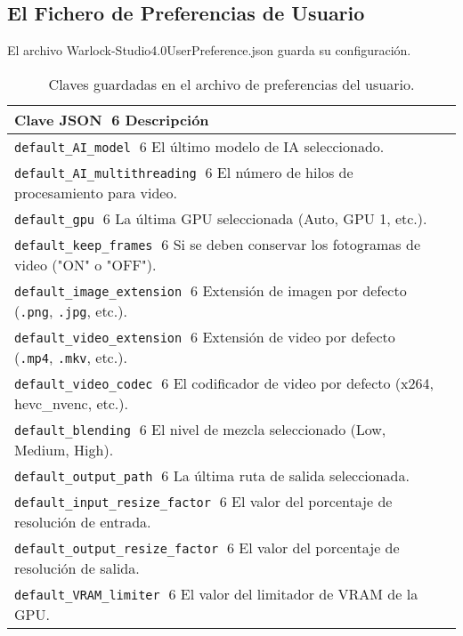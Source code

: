 \documentclass[11pt, a4paper]{article}
\begin{document}
\subsection{El Fichero de Preferencias de Usuario}
El archivo Warlock-Studio4.0UserPreference.json guarda su configuración.
\begin{table}[H]
    \centering
    \small %
    \begin{tabularx}{\textwidth}{l X}
        \toprule
        \textbf{Clave JSON} 6 \textbf{Descripción} \\
        \midrule
        \texttt{default\_AI\_model} 6 El último modelo de IA seleccionado. \\
        \texttt{default\_AI\_multithreading} 6 El número de hilos de procesamiento para video. \\
        \texttt{default\_gpu} 6 La última GPU seleccionada (Auto, GPU 1, etc.). \\
        \texttt{default\_keep\_frames} 6 Si se deben conservar los fotogramas de video ("ON" o "OFF"). \\
        \texttt{default\_image\_extension} 6 Extensión de imagen por defecto (\texttt{.png}, \texttt{.jpg}, etc.). \\
        \texttt{default\_video\_extension} 6 Extensión de video por defecto (\texttt{.mp4}, \texttt{.mkv}, etc.). \\
        \texttt{default\_video\_codec} 6 El codificador de video por defecto (x264, hevc\_nvenc, etc.). \\
        \texttt{default\_blending} 6 El nivel de mezcla seleccionado (Low, Medium, High). \\
        \texttt{default\_output\_path} 6 La última ruta de salida seleccionada. \\
        \texttt{default\_input\_resize\_factor} 6 El valor del porcentaje de resolución de entrada. \\
        \texttt{default\_output\_resize\_factor} 6 El valor del porcentaje de resolución de salida. \\
        \texttt{default\_VRAM\_limiter} 6 El valor del limitador de VRAM de la GPU. \\
        \bottomrule
    \end{tabularx}
    \caption{Claves guardadas en el archivo de preferencias del usuario.}
\end{table}
\end{document}
